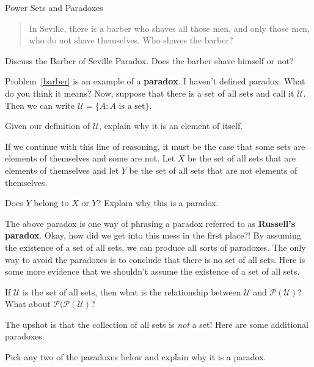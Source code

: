 \begin{section}{Power Sets and Paradoxes}
\begin{quote}
In Seville, there is a barber who shaves all those men, and only those men, who do not shave themselves.  Who shaves the barber?
\end{quote}

\begin{problem}\label{barber}
Discuss the Barber of Seville Paradox.  Does the barber shave himself or not?
\end{problem}

Problem~\ref{barber} is an example of a \textbf{paradox}.  I haven't defined paradox.  What do you think it means?  Now, suppose that there is a set of all sets and call it $\mathcal{U}$.  Then we can write $\mathcal{U}=\{A:A\mbox{ is a set}\}$.

\begin{problem}
Given our definition of $\mathcal{U}$, explain why it is an element of itself.
\end{problem}

If we continue with this line of reasoning, it must be the case that some sets are elements of themselves and some are not.  Let $X$ be the set of all sets that are elements of themselves and let $Y$ be the set of all sets that are not elements of themselves.

\begin{question}
Does $Y$ belong to $X$ or $Y$?  Explain why this is a paradox.
\end{question}

The above paradox is one way of phrasing a paradox referred to as \textbf{Russell's paradox}.  Okay, how did we get into this mess in the first place?!  By assuming the existence of a set of all sets, we can produce all sorts of paradoxes.  The only way to avoid the paradoxes is to conclude that there is no set of all sets.  Here is some more evidence that we shouldn't assume the existence of a set of all sets.

\begin{question}
If $\mathcal{U}$ is the set of all sets, then what is the relationship between $\mathcal{U}$ and $\mathcal{P}(\mathcal{U})$?  What about $\mathcal{P}(\mathcal{P}(\mathcal{U})$?
\end{question}

The upshot is that the collection of all sets is \emph{not} a set!  Here are some additional paradoxes.

\begin{problem}
Pick any two of the paradoxes below and explain why it is a paradox.
\end{problem}


\end{section}
